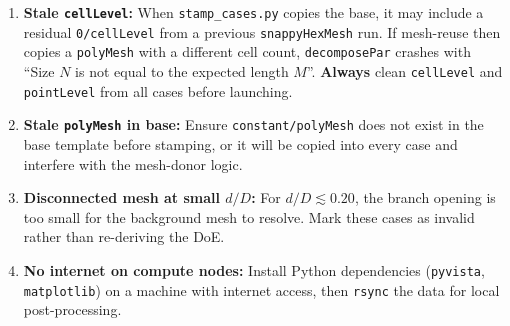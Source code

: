 \documentclass[12pt,a4paper]{report}
\begin{document}
\begin{enumerate}
  \item \textbf{Stale \texttt{cellLevel}:}  When
        \texttt{stamp\_cases.py} copies the base, it may include a
        residual \texttt{0/cellLevel} from a previous
        \texttt{snappyHexMesh} run.  If mesh-reuse then copies a
        \texttt{polyMesh} with a different cell count,
        \texttt{decomposePar} crashes with ``Size $N$ is not equal
        to the expected length $M$''.  \textbf{Always} clean
        \texttt{cellLevel} and \texttt{pointLevel} from all cases
        before launching.
  \item \textbf{Stale \texttt{polyMesh} in base:}  Ensure
        \texttt{constant/polyMesh} does not exist in the base
        template before stamping, or it will be copied into every
        case and interfere with the mesh-donor logic.
  \item \textbf{Disconnected mesh at small $d/D$:}  For $d/D
        \lesssim 0.20$, the branch opening is too small for the
        background mesh to resolve.  Mark these cases as invalid
        rather than re-deriving the DoE.
  \item \textbf{No internet on compute nodes:}  Install Python
        dependencies (\texttt{pyvista}, \texttt{matplotlib}) on a
        machine with internet access, then \texttt{rsync} the data
        for local post-processing.
\end{enumerate}


\vfill
\noindent{}
\end{document}
